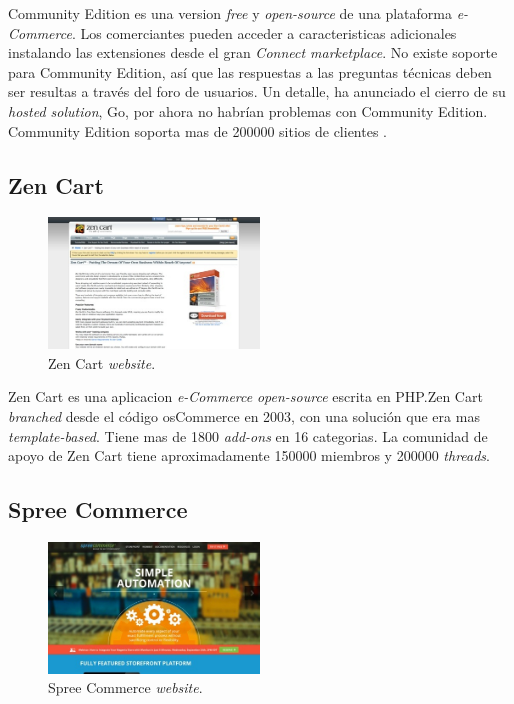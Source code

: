 \nameMagento Community Edition es una version \textit{free} y \textit{open-source} de  una plataforma \textit{e-Commerce}. Los comerciantes pueden acceder a caracteristicas adicionales instalando las extensiones desde el gran \textit{\nameMagento Connect marketplace}. No existe soporte para \nameMagento Community Edition, así que las respuestas a las preguntas técnicas deben ser resultas a través del foro de usuarios. Un detalle, \nameMagento ha anunciado el cierro de su \textit{hosted solution}, \nameMagento Go, por ahora no habrían problemas con Community Edition. \nameMagento Community Edition soporta mas de 200000 sitios de clientes .

\newcommand{\nameZenCart}{Zen Cart }
\subsection{\nameZenCart}

\begin{figure}[h!]
	\centering
	\includegraphics[width=0.5\textwidth]{figuras/cap1/ZenCartWebsite.jpg}
	\caption{\nameZenCart \textit{website}\cite{online_ZenCart}.}
\end{figure}

\nameZenCart es una aplicacion \textit{e-Commerce} \textit{open-source} escrita en PHP.\nameZenCart \textit{branched} desde el código osCommerce en 2003, con una solución que era mas \textit{template-based}. Tiene mas de 1800 \textit{add-ons} en 16 categorias. La comunidad de apoyo de \nameZenCart tiene aproximadamente 150000 miembros y 200000 \textit{threads}.

\newcommand{\nameSpreeCommerce}{Spree Commerce }
\subsection{\nameSpreeCommerce}

\begin{figure}[h!]
	\centering
	\includegraphics[width=0.5\textwidth]{figuras/cap1/SpreeCommerceWebsite.jpg}
	\caption{\nameSpreeCommerce \textit{website}\cite{online_SpreeCommerce}.}
\end{figure}

